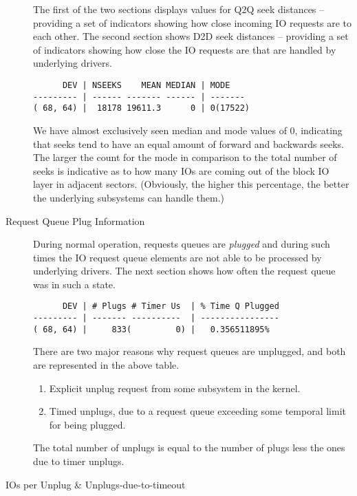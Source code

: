 \documentclass{article}
\begin{document}
\begin{description}
  The first of the two sections displays values for Q2Q seek distances --
  providing a set of indicators showing how close incoming IO requests
  are to each other. The second section shows D2D seek distances --
  providing a set of indicators showing how close the IO requests are
  that are handled by underlying drivers.

\begin{verbatim}
      DEV | NSEEKS    MEAN MEDIAN | MODE
--------- | ------ ------- ------ | -------
( 68, 64) |  18178 19611.3      0 | 0(17522)
\end{verbatim}

  We have almost exclusively seen median and mode values of 0, indicating
  that seeks tend to have an equal amount of forward and backwards
  seeks. The larger the count for the mode in comparison to the total
  number of seeks is indicative as to how many IOs are coming out of
  the block IO layer in adjacent sectors. (Obviously, the higher this
  percentage, the better the underlying subsystems can handle them.)

  \item[Request Queue Plug Information]

  During normal operation, requests queues are \emph{plugged} and during
  such times the IO request queue elements are not able to be processed
  by underlying drivers. The next section shows how often the request
  queue was in such a state.

\begin{verbatim}
      DEV | # Plugs # Timer Us  | % Time Q Plugged
--------- | ------- ----------  | ----------------
( 68, 64) |     833(         0) |   0.356511895%
\end{verbatim}

  There are two major reasons why request queues are unplugged, and both
  are represented in the above table.

  \begin{enumerate}
    \item Explicit unplug request from some subsystem in the kernel.

    \item Timed unplugs, due to a request queue exceeding some temporal
    limit for being plugged.
  \end{enumerate}

  The total number of unplugs is equal to the number of plugs less the
  ones due to timer unplugs.

  \item[IOs per Unplug \& Unplugs-due-to-timeout]


\end{description}
\end{document}
